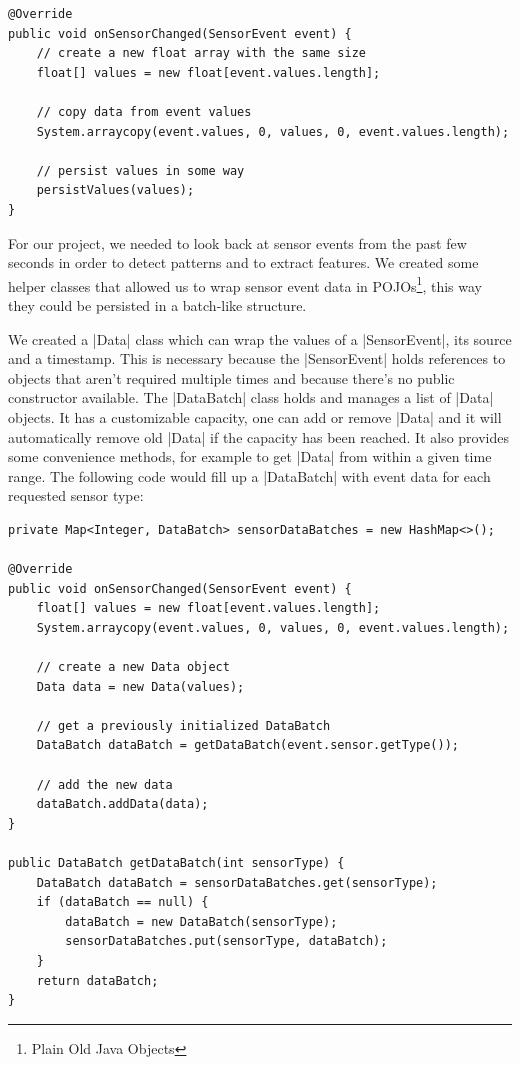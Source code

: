 \begin{lstlisting}[label=arraycopy]
@Override
public void onSensorChanged(SensorEvent event) {
	// create a new float array with the same size
	float[] values = new float[event.values.length];

	// copy data from event values
	System.arraycopy(event.values, 0, values, 0, event.values.length);

	// persist values in some way
	persistValues(values);
}
\end{lstlisting}

\clearpage

For our project, we needed to look back at sensor events from the past few seconds in order to detect patterns and to extract features.
We created some helper classes\cite{sensordatalogger:datapackage} that allowed us to wrap sensor event data in POJOs\footnote{Plain Old Java Objects}, this way they could be persisted in a batch-like structure.

We created a |Data|\cite{sensordatalogger:data} class which can wrap the values of a |SensorEvent|, its source and a timestamp.
This is necessary because the |SensorEvent| holds references to objects that aren't required multiple times and because there's no public constructor available. The |DataBatch|\cite{sensordatalogger:databatch} class holds and manages a list of |Data| objects.
It has a customizable capacity, one can add or remove |Data| and it will automatically remove old |Data| if the capacity has been reached.
It also provides some convenience methods, for example to get |Data| from within a given time range.
The following code would fill up a |DataBatch| with event data for each requested sensor type:

\begin{lstlisting}[label=datahelperclasses]
private Map<Integer, DataBatch> sensorDataBatches = new HashMap<>();

@Override
public void onSensorChanged(SensorEvent event) {
	float[] values = new float[event.values.length];
	System.arraycopy(event.values, 0, values, 0, event.values.length);

	// create a new Data object
	Data data = new Data(values);

	// get a previously initialized DataBatch
	DataBatch dataBatch = getDataBatch(event.sensor.getType());

	// add the new data
	dataBatch.addData(data);
}

public DataBatch getDataBatch(int sensorType) {
	DataBatch dataBatch = sensorDataBatches.get(sensorType);
	if (dataBatch == null) {
		dataBatch = new DataBatch(sensorType);
		sensorDataBatches.put(sensorType, dataBatch);
	}
	return dataBatch;
}
\end{lstlisting}

